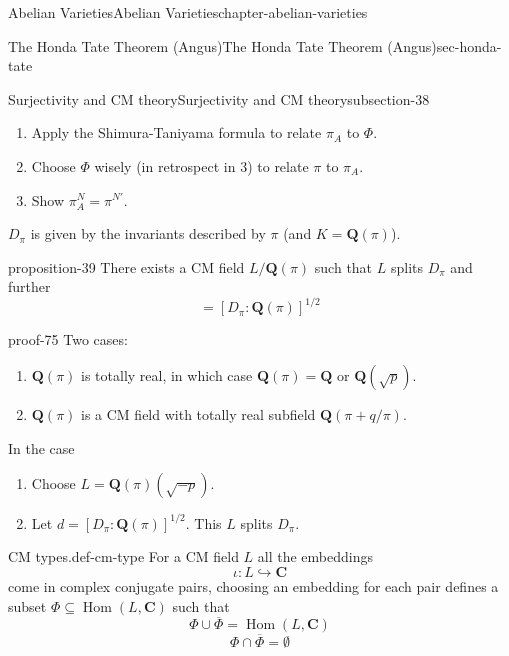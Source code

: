 \documentclass[oneside,10pt,]{book}
\numberwithin{equation}{section}
\newcommand{\lb}{[}
\newcommand{\rb}{]}
\newcommand{\QQ}{\mathbf{Q}}
\newcommand{\CC}{\mathbf{C}}
\DeclareMathOperator{\Hom}{Hom}
\begin{document}
\begin{chapterptx}{Abelian Varieties}{}{Abelian Varieties}{}{}{chapter-abelian-varieties}
\begin{sectionptx}{The Honda Tate Theorem (Angus)}{}{The Honda Tate Theorem (Angus)}{}{}{sec-honda-tate}
\begin{subsectionptx}{Surjectivity and CM theory}{}{Surjectivity and CM theory}{}{}{subsection-38}
\begin{enumerate}
\item\hypertarget{li-91}{}Apply the Shimura-Taniyama formula to relate \(\pi_A\) to \(\Phi\).%
\item\hypertarget{li-92}{}Choose \(\Phi\) wisely (in retrospect in 3) to relate \(\pi\) to \(\pi_A\).%
\item\hypertarget{li-93}{}Show \(\pi_A^N = \pi^{N'}\).%
\end{enumerate}
%
\par
\hypertarget{p-438}{}%
\(D_\pi\) is given by the invariants described by \(\pi\) (and \(K = \QQ(\pi)\)).%
\begin{proposition}{}{}{proposition-39}%
\hypertarget{p-439}{}%
There exists a CM field \(L/\QQ(\pi)\) such that \(L\) splits \(D_\pi\) and further%
\begin{equation*}
[L:\QQ(\pi) ] = [ D_\pi: \QQ(\pi)]^{1/2}
\end{equation*}
%
\end{proposition}
\begin{proofptx}{}{proof-75}
\hypertarget{p-440}{}%
Two cases:\leavevmode%
\begin{enumerate}
\item\hypertarget{li-94}{}\(\QQ(\pi)\) is totally real, in which case \(\QQ(\pi) = \QQ\) or \(\QQ(\sqrt{p})\).%
\item\hypertarget{li-95}{}\(\QQ(\pi)\) is a CM field with totally real subfield \(\QQ(\pi + q/\pi)\).%
\end{enumerate}
In the case\leavevmode%
\begin{enumerate}
\item\hypertarget{li-96}{}Choose \(L = \QQ(\pi)(\sqrt{-p})\).%
\item\hypertarget{li-97}{}Let \(d= \lb D_\pi: \QQ(\pi)\rb^{1/2}\). This \(L\) splits \(D_\pi\).%
\end{enumerate}
%
\end{proofptx}
\begin{definition}{CM types.}{def-cm-type}%
\hypertarget{p-441}{}%
For a CM field \(L\) all the embeddings%
\begin{equation*}
\iota\colon L \hookrightarrow \CC
\end{equation*}
come in complex conjugate pairs, choosing an embedding for each pair defines a subset \(\Phi\subseteq \Hom(L, \CC)\) such that%
\begin{equation*}
\Phi \cup \overline \Phi = \Hom(L,\CC)
\end{equation*}
%
\begin{equation*}
\Phi \cap \overline \Phi = \emptyset

\end{equation*}
\end{definition}
\end{subsectionptx}
\end{sectionptx}
\end{chapterptx}
\end{document}
